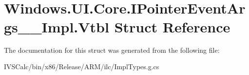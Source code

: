 \hypertarget{struct_windows_1_1_u_i_1_1_core_1_1_i_pointer_event_args_____impl_1_1_vtbl}{}\section{Windows.\+U\+I.\+Core.\+I\+Pointer\+Event\+Args\+\_\+\+\_\+\+Impl.\+Vtbl Struct Reference}
\label{struct_windows_1_1_u_i_1_1_core_1_1_i_pointer_event_args_____impl_1_1_vtbl}


The documentation for this struct was generated from the following file\+:\begin{DoxyCompactItemize}
\item 
I\+V\+S\+Calc/bin/x86/\+Release/\+A\+R\+M/ilc/Impl\+Types.\+g.\+cs\end{DoxyCompactItemize}
